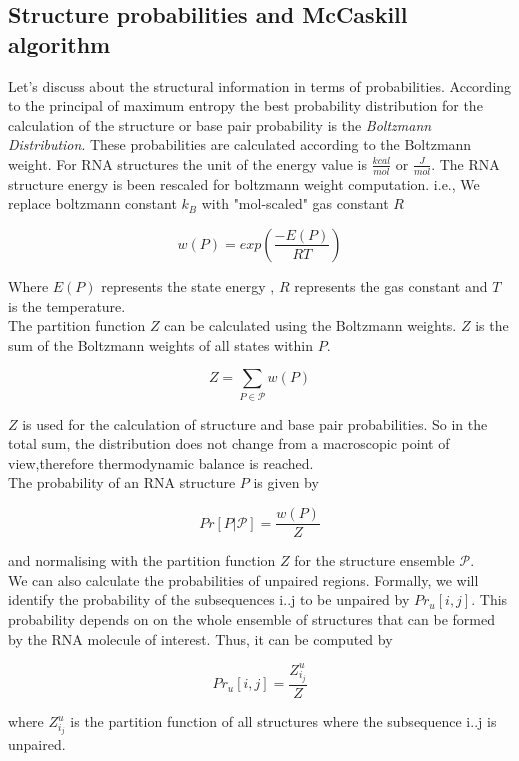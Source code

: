 \documentclass[twoside,a4paper]{report}
\begin{document}
 	 \subsection{Structure probabilities and McCaskill algorithm}
 	 Let's discuss about the structural information in terms of probabilities. According to the principal of maximum entropy \citep{jaynes1957information} the best probability distribution for the calculation of the structure or base pair probability is the \textit{Boltzmann Distribution}. These probabilities are calculated according to the Boltzmann weight. For RNA structures the unit of the energy value is $\frac{kcal}{mol}$ or $\frac{J}{mol}$. The RNA structure energy is been rescaled for boltzmann weight computation. i.e., We replace boltzmann constant $k_B$ with "mol-scaled" gas constant $R$\\
 	 
 	 \begin{center}	 
 	 \[ 
 	 w(P)= exp\left( \frac{-E(P)}{RT} \right)
 	 \]
 	 \end{center}
 	 
 	 Where $E(P)$ represents the state energy , $R $ represents the gas constant and $T$ is the temperature.\\
 	 The partition function $Z$ can be calculated using the Boltzmann weights. $Z$ is the sum of the Boltzmann weights of all states within $P$. \\
 	 \begin{center}	 
 	 	\[ 
 	 	Z= \sum_{P \in \mathcal{P}} w(P)
 	 	\]
 	 \end{center}
 	 
 	 $Z$ is used for the calculation of structure and base pair probabilities. So in the total sum, the distribution does not change from a macroscopic point of view,therefore thermodynamic balance is reached.\\
 	 The probability of an RNA structure $P$ is given by \\  
 	  \begin{center}	 
 	 	\[ 
 	 Pr[P|\mathcal{P}] = \frac{w(P)}{Z} 
 	 	\]
 	 \end{center}
  	 and normalising with the partition function $Z$ for the structure ensemble $\mathcal{P}$.  \\
  	
  	 We can also calculate the probabilities of unpaired regions. Formally, we will identify the probability of the subsequences i..j to be unpaired by $Pr_u[i,j]$. This probability depends on  on the whole ensemble of structures that can be formed by the RNA molecule of interest. Thus, it can be computed by\\
     \begin{center}	 
     	\[ 
     	Pr_u[i,j] = \frac{Z^u_{i_j}}{Z}
     	\]
     \end{center}
 	 where $Z^u_{i_j}$ is the partition function of all structures where the subsequence i..j is unpaired.\\
 	 
\end{document}
